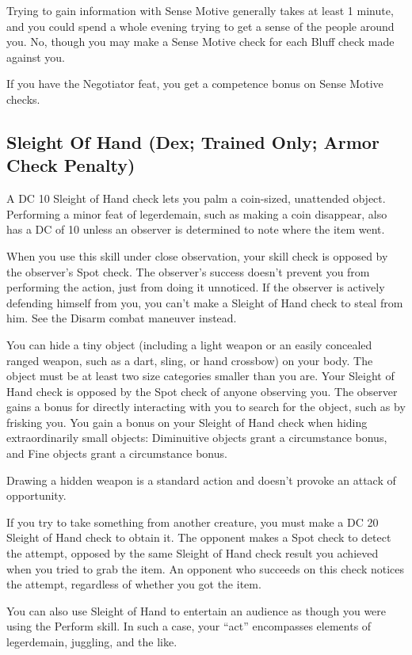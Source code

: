  Trying to gain information with Sense Motive generally takes at least 1 minute, and you could spend a whole evening trying to get a sense of the people around you.
 No, though you may make a Sense Motive check for each Bluff check made against you.
\par If you have the Negotiator feat, you get a  competence bonus on Sense
Motive checks.

\subsection{Sleight Of Hand (Dex; Trained Only; Armor Check Penalty)}
 A DC 10 Sleight of Hand check lets you palm a coin-sized, unattended object. Performing a minor feat of legerdemain, such as making a coin disappear, also has a DC of 10 unless an observer is determined to note where the item went.

When you use this skill under close observation, your skill check is opposed by the observer's Spot check. The observer's success doesn't prevent you from performing the action, just from doing it unnoticed. If the observer is actively defending himself from you, you can't make a Sleight of Hand check to steal from him. See the Disarm combat maneuver instead.

You can hide a tiny object (including a light weapon or an easily concealed ranged weapon, such as a dart, sling, or hand crossbow) on your body. The object must be at least two size categories smaller than you are. Your Sleight of Hand check is opposed by the Spot check of anyone observing you. The observer gains a  bonus for directly interacting with you to search for the object, such as by frisking you. You gain a bonus on your Sleight of Hand check when hiding extraordinarily small objects: Diminuitive objects grant a  circumstance bonus, and Fine objects grant a  circumstance bonus.

Drawing a hidden weapon is a standard action and doesn't provoke an attack of opportunity.

If you try to take something from another creature, you must make a DC 20 Sleight of Hand check to obtain it. The opponent makes a Spot check to detect the attempt, opposed by the same Sleight of Hand check result you achieved when you tried to grab the item. An opponent who succeeds on this check notices the attempt, regardless of whether you got the item.

You can also use Sleight of Hand to entertain an audience as though you were using the Perform skill. In such a case, your ``act'' encompasses elements of legerdemain, juggling, and the like.

